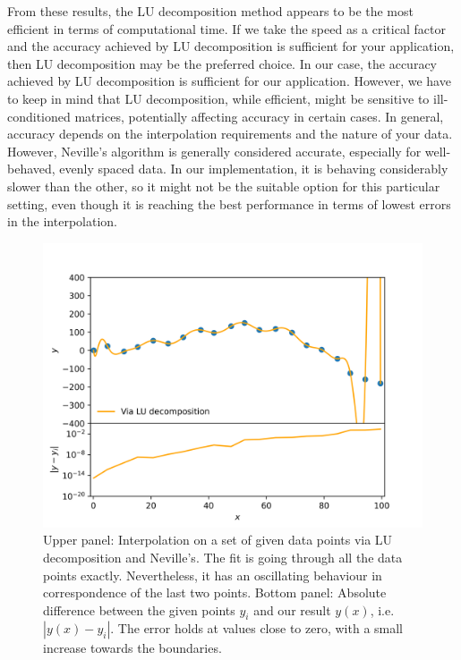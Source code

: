 From these results, the LU decomposition method appears to be the most efficient in terms of computational time. If we take the speed as a critical factor and the accuracy achieved by LU decomposition is sufficient for your application, then LU decomposition may be the preferred choice. In our case, the accuracy achieved by LU decomposition is sufficient for our application. However, we have to keep in mind that LU decomposition, while efficient, might be sensitive to ill-conditioned matrices, potentially affecting accuracy in certain cases. In general, accuracy depends on the interpolation requirements and the nature of your data. However, Neville's algorithm is generally considered accurate, especially for well-behaved, evenly spaced data. In our implementation, it is behaving considerably slower than the other, so it might not be the suitable option for this particular setting, even though it is reaching the best performance in terms of lowest errors in the interpolation.


\begin{figure}[h!]
  \centering
  \includegraphics[width=0.9\linewidth]{./plots/my_vandermonde_sol_2a.png}
  \caption{Upper panel: Interpolation on a set of given data points via LU decomposition and Neville's. The fit is going through all the data points exactly. Nevertheless, it has an oscillating behaviour in correspondence of the last two points. Bottom panel: Absolute difference between the given points $y_i$ and our result $y(x)$, i.e. $|y(x) - y_{i}|$. The error holds at values close to zero, with a small increase towards the boundaries.}
  \label{fig:lu_dec}
\end{figure}

